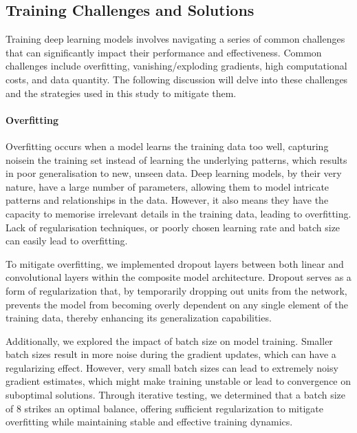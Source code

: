 \subsection{Training Challenges and Solutions}
\label{subsec:3_training_challenges_and_solutions}
Training deep learning models involves navigating a series of common challenges that can significantly impact their performance and effectiveness. Common challenges include overfitting, vanishing/exploding gradients, high computational costs, and data quantity. The following discussion will delve into these challenges and the strategies used in this study to mitigate them.

\paragraph*{Overfitting}
\label{par:3_overfitting}
Overfitting occurs when a model learns the training data too well, capturing noisein the training set instead of learning the underlying patterns, which results in poor generalisation to new, unseen data. Deep learning models, by their very nature, have a large number of parameters, allowing them to model intricate patterns and relationships in the data. However, it also means they have the capacity to memorise irrelevant details in the training data, leading to overfitting. Lack of regularisation techniques, or poorly chosen learning rate and batch size can easily lead to overfitting. 

To mitigate overfitting, we implemented dropout layers between both linear and convolutional layers within the composite model architecture. Dropout serves as a form of regularization that, by temporarily dropping out units from the network, prevents the model from becoming overly dependent on any single element of the training data, thereby enhancing its generalization capabilities.

Additionally, we explored the impact of batch size on model training. Smaller batch sizes result in more noise during the gradient updates, which can have a regularizing effect. However, very small batch sizes can lead to extremely noisy gradient estimates, which might make training unstable or lead to convergence on suboptimal solutions. Through iterative testing, we determined that a batch size of 8 strikes an optimal balance, offering sufficient regularization to mitigate overfitting while maintaining stable and effective training dynamics.

